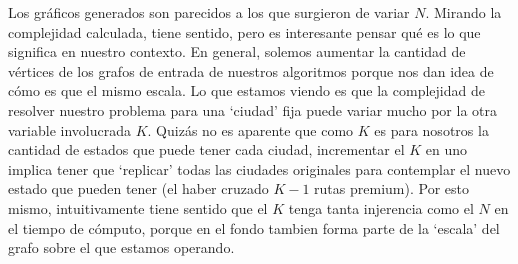 Los gráficos generados son parecidos a los que surgieron de variar $N$. Mirando la complejidad calculada, tiene sentido, pero es interesante pensar qué es lo que significa en nuestro contexto. En general, solemos aumentar la cantidad de vértices de los grafos de entrada de nuestros algoritmos porque nos dan idea de cómo es que el mismo escala. Lo que estamos viendo es que la complejidad de resolver nuestro problema para una `ciudad' fija puede variar mucho por la otra variable involucrada $K$. Quizás no es aparente que como $K$ es para nosotros la cantidad de estados que puede tener cada ciudad, incrementar el $K$ en uno implica tener que `replicar' todas las ciudades originales para contemplar el nuevo estado que pueden tener (el haber cruzado $K-1$ rutas premium). Por esto mismo, intuitivamente tiene sentido que el $K$ tenga tanta injerencia como el $N$ en el tiempo de cómputo, porque en el fondo tambien forma parte de la `escala' del grafo sobre el que estamos operando.